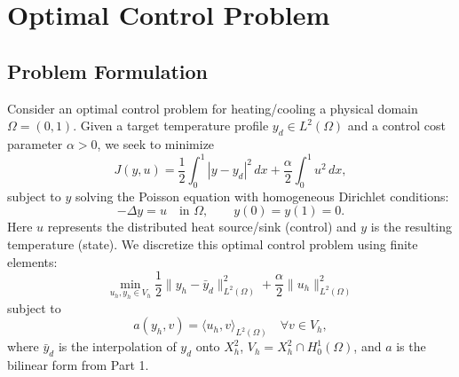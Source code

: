 \documentclass[a4paper,10pt]{article}
\begin{document}
\section{Optimal Control Problem}
\subsection{Problem Formulation}

Consider an optimal control problem for heating/cooling a physical domain \(\Omega=(0,1)\).
Given a target temperature profile \(y_d \in L^2(\Omega)\) and a control cost parameter \(\alpha > 0\), we seek to minimize
\[
	J(y,u) = \frac{1}{2}\int_0^1 |y-y_d|^2\,dx + \frac{\alpha}{2}\int_0^1 u^2\,dx,
\]
subject to \(y\) solving the Poisson equation with homogeneous Dirichlet conditions:
\[
	-\Delta y = u \quad\text{in }\Omega, \qquad y(0) = y(1) = 0.
\]
Here \(u\) represents the distributed heat source/sink (control) and \(y\) is the resulting temperature (state).
We discretize this optimal control problem using finite elements:
\[
	\min_{u_h,y_h\in V_h} \frac{1}{2}\|y_h - \bar{y}_d\|^2_{L^2(\Omega)} + \frac{\alpha}{2}\|u_h\|^2_{L^2(\Omega)}
\]
subject to
\[
	a(y_h,v) = \langle u_h,v \rangle_{L^2(\Omega)} \quad \forall v\in V_h,
\]
where \(\bar{y}_d\) is the interpolation of \(y_d\) onto \(X^2_h\), \(V_h = X^2_h \cap H^1_0(\Omega)\), and \(a\) is the bilinear form from Part 1.
\end{document}
